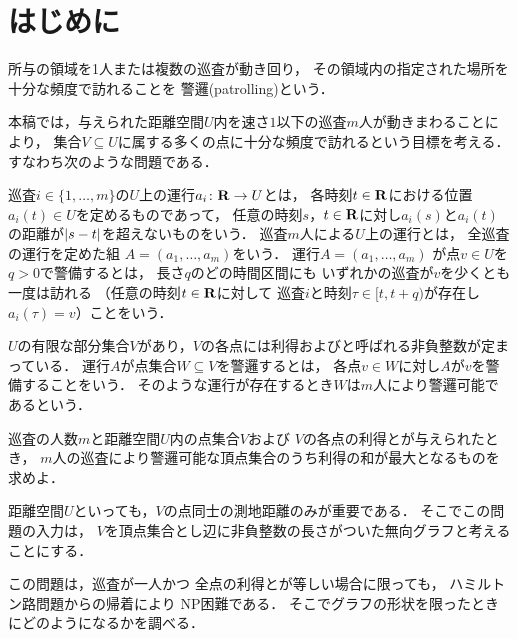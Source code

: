 \section{はじめに}
所与の領域を1人または複数の巡査が動き回り，
その領域内の指定された場所を十分な頻度で訪れることを
警邏(patrolling)という\cite{chen2013fence, coene2011charlemagne, czyzowicz2011boundary}．


本稿では，与えられた距離空間$U$内を速さ$1$以下の巡査$m$人が動きまわることにより，
集合$V \subseteq U$に属する多くの点に十分な頻度で訪れるという目標を考える．
すなわち次のような問題である．

巡査$i \in \{1, \ldots, m\}$の$U$上の運行$a _i \colon \mathbf R \to U$とは，
各時刻$t \in \mathbf R$における位置$a _i (t) \in U$を定めるものであって，
任意の時刻$s$，$t \in \mathbf R$に対し$a _i (s)$と$a _i (t)$の距離が$\lvert{s - t}\rvert$を超えないものをいう．
巡査$m$人による$U$上の運行とは，
全巡査の運行を定めた組
$A = (a _1, \dots, a _m)$をいう．
運行$A = (a _1, \dots, a _m)$
が点$v \in U$を{\idletime}$q > 0$で警備するとは，
長さ$q$のどの時間区間にも
いずれかの巡査が$v$を少くとも一度は訪れる
（任意の時刻$t \in \mathbf R$に対して
巡査$i$と時刻$\tau \in [t, t + q)$が存在し
$a _i (\tau) = v$）ことをいう．

$U$の有限な部分集合$V$があり，$V$の各点には利得および{\idletime}と呼ばれる非負整数が定まっている．
運行$A$が点集合$W \subseteq V$を警邏するとは，
各点$v \in W$に対し$A$が$v$を警備することをいう．
そのような運行が存在するとき$W$は$m$人により警邏可能であるという．

\begin{patrollingProblem}
  巡査の人数$m$と距離空間$U$内の点集合$V$および
  $V$の各点の利得と{\idletime}が与えられたとき，
  $m$人の巡査により警邏可能な頂点集合のうち利得の和が最大となるものを求めよ．
\end{patrollingProblem}

距離空間$U$といっても，$V$の点同士の測地距離のみが重要である．
そこでこの問題の入力は，
$V$を頂点集合とし辺に非負整数の長さがついた無向グラフと考えることにする．

この問題は，巡査が一人かつ
全点の利得と{\idletime}が等しい場合に限っても，
ハミルトン路問題からの帰着により
NP困難である\cite[Theorem~8]{coene2011charlemagne}．
そこでグラフの形状を限ったときにどのようになるかを調べる．

